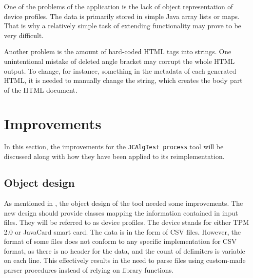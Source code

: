 One of the problems of the application is the lack of object representation of device profiles. The data is primarily stored in simple Java array lists or maps. That is why a relatively simple task of extending functionality may prove to be very difficult. 

Another problem is the amount of hard-coded HTML tags into strings. One unintentional mistake of deleted angle bracket may corrupt the whole HTML output. To change, for instance, something in the metadata of each generated HTML, it is needed to manually change the string, which creates the body part of the HTML document. 

\section{Improvements}
In this section, the improvements for the \texttt{JCAlgTest process} tool will be discussed along with how they have been applied to its reimplementation.

\subsection{Object design}
As mentioned in , the object design of the tool needed some improvements. The new design should provide classes mapping the information contained in input files. They will be referred to as device profiles. The device stands for either TPM 2.0 or JavaCard smart card. The data is in the form of CSV files. However, the format of some files does not conform to any specific implementation for CSV format, as there is no header for the data, and the count of delimiters is variable on each line. This effectively results in the need to parse files using custom-made parser procedures instead of relying on library functions.

